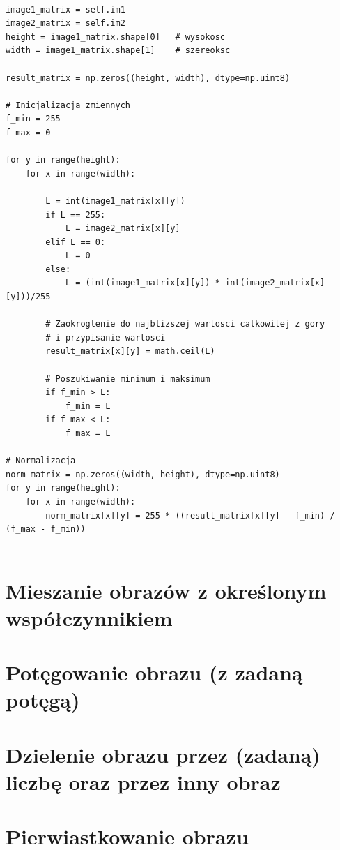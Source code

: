 \documentclass[final,a4paper,openany,12pt]{mwbk}
\begin{document}
\begin{lstlisting}[caption=Mnożenie obrazu szarego przez inny obraz ]

image1_matrix = self.im1
image2_matrix = self.im2
height = image1_matrix.shape[0]   # wysokosc
width = image1_matrix.shape[1]    # szereoksc

result_matrix = np.zeros((height, width), dtype=np.uint8)

# Inicjalizacja zmiennych
f_min = 255
f_max = 0

for y in range(height):
    for x in range(width):  

        L = int(image1_matrix[x][y]) 
        if L == 255:
            L = image2_matrix[x][y]
        elif L == 0:
            L = 0
        else:
            L = (int(image1_matrix[x][y]) * int(image2_matrix[x][y]))/255 

        # Zaokroglenie do najblizszej wartosci calkowitej z gory
        # i przypisanie wartosci
        result_matrix[x][y] = math.ceil(L)
                        
        # Poszukiwanie minimum i maksimum
        if f_min > L:
            f_min = L
        if f_max < L:
            f_max = L

# Normalizacja
norm_matrix = np.zeros((width, height), dtype=np.uint8)
for y in range(height):
    for x in range(width):
        norm_matrix[x][y] = 255 * ((result_matrix[x][y] - f_min) / (f_max - f_min))
    

\end{lstlisting}

\section {Mieszanie obrazów z określonym współczynnikiem}
\section {Potęgowanie obrazu (z zadaną potęgą)}
\section {Dzielenie obrazu przez (zadaną) liczbę oraz przez inny obraz}
\section {Pierwiastkowanie obrazu}
\end{document}
